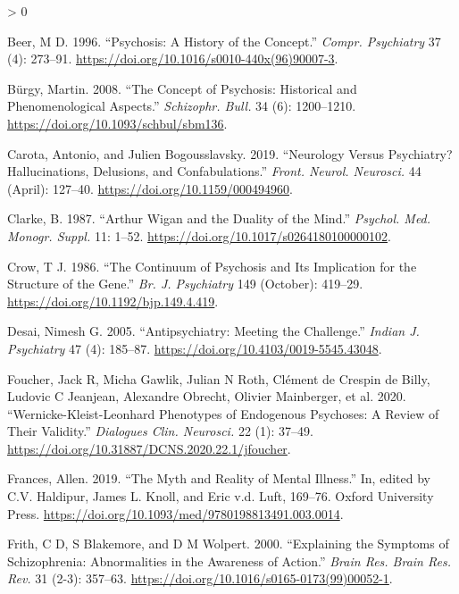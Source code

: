 \documentclass[
]{article}
\newlength{\cslhangindent}
\newenvironment{CSLReferences}[2] %
 {%
  \setlength{\parindent}{0pt}
  \ifodd #1 \everypar{\setlength{\hangindent}{\cslhangindent}}\ignorespaces\fi
  \ifnum #2 > 0
  \setlength{\parskip}{#2\baselineskip}
  \fi
 }%
 {}
\begin{document}
\hypertarget{refs}{}
\begin{CSLReferences}{1}{0}
\leavevmode\hypertarget{ref-Beer1996-qw}{}%
Beer, M D. 1996. {``Psychosis: A History of the Concept.''} \emph{Compr.
Psychiatry} 37 (4): 273--91.
\url{https://doi.org/10.1016/s0010-440x(96)90007-3}.

\leavevmode\hypertarget{ref-Burgy2008-pb}{}%
Bürgy, Martin. 2008. {``The Concept of Psychosis: Historical and
Phenomenological Aspects.''} \emph{Schizophr. Bull.} 34 (6): 1200--1210.
\url{https://doi.org/10.1093/schbul/sbm136}.

\leavevmode\hypertarget{ref-Carota2019-sx}{}%
Carota, Antonio, and Julien Bogousslavsky. 2019. {``Neurology Versus
Psychiatry? Hallucinations, Delusions, and Confabulations.''}
\emph{Front. Neurol. Neurosci.} 44 (April): 127--40.
\url{https://doi.org/10.1159/000494960}.

\leavevmode\hypertarget{ref-Clarke1987-xu}{}%
Clarke, B. 1987. {``Arthur Wigan and the Duality of the Mind.''}
\emph{Psychol. Med. Monogr. Suppl.} 11: 1--52.
\url{https://doi.org/10.1017/s0264180100000102}.

\leavevmode\hypertarget{ref-Crow1986-qt}{}%
Crow, T J. 1986. {``The Continuum of Psychosis and Its Implication for
the Structure of the Gene.''} \emph{Br. J. Psychiatry} 149 (October):
419--29. \url{https://doi.org/10.1192/bjp.149.4.419}.

\leavevmode\hypertarget{ref-Desai2005-aq}{}%
Desai, Nimesh G. 2005. {``Antipsychiatry: Meeting the Challenge.''}
\emph{Indian J. Psychiatry} 47 (4): 185--87.
\url{https://doi.org/10.4103/0019-5545.43048}.

\leavevmode\hypertarget{ref-Foucher2020-ot}{}%
Foucher, Jack R, Micha Gawlik, Julian N Roth, Clément de Crespin de
Billy, Ludovic C Jeanjean, Alexandre Obrecht, Olivier Mainberger, et al.
2020. {``{Wernicke-Kleist-Leonhard} Phenotypes of Endogenous Psychoses:
A Review of Their Validity.''} \emph{Dialogues Clin. Neurosci.} 22 (1):
37--49. \url{https://doi.org/10.31887/DCNS.2020.22.1/jfoucher}.

\leavevmode\hypertarget{ref-frances2019}{}%
Frances, Allen. 2019. {``The Myth and Reality of Mental Illness.''} In,
edited by C.V. Haldipur, James L. Knoll, and Eric v.d. Luft, 169--76.
Oxford University Press.
\url{https://doi.org/10.1093/med/9780198813491.003.0014}.

\leavevmode\hypertarget{ref-Frith2000-nm}{}%
Frith, C D, S Blakemore, and D M Wolpert. 2000. {``Explaining the
Symptoms of Schizophrenia: Abnormalities in the Awareness of Action.''}
\emph{Brain Res. Brain Res. Rev.} 31 (2-3): 357--63.
\url{https://doi.org/10.1016/s0165-0173(99)00052-1}.


\end{CSLReferences}
\end{document}
